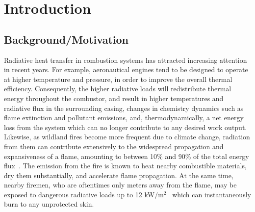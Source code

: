 \addchapheadtotoc

\chapter{Introduction} \label{chapter:Introduction}

\section{Background/Motivation}
Radiative heat transfer in combustion systems has attracted increasing attention in recent years.
For example, aeronautical engines tend to be designed to operate at higher temperature and pressure, in order to improve the overall thermal efficiency.
Consequently, the higher radiative loads will redistribute thermal energy throughout the combustor, and result in higher temperatures and radiative flux in the surrounding casing, changes in chemistry dynamics such as flame extinction and pollutant emissions, and, thermodynamically, a net energy loss from the system which can no longer contribute to any desired work output.
Likewise, as wildland fires become more frequent due to climate change, radiation from them can contribute extensively to the widespread propagation and expansiveness of a flame, amounting to between 10\% and 90\% of the total energy flux~\cite{Valendik2008EffectEnvironment}. 
The emission from the fire is known to heat nearby combustible materials, dry them substantially, and accelerate flame propagation. At the same time, nearby firemen, who are oftentimes only meters away from the flame, may be exposed to dangerous radiative loads up to 12 kW/m$^2$~\cite{Valendik2008EffectEnvironment} which can instantaneously burn to any unprotected skin.

